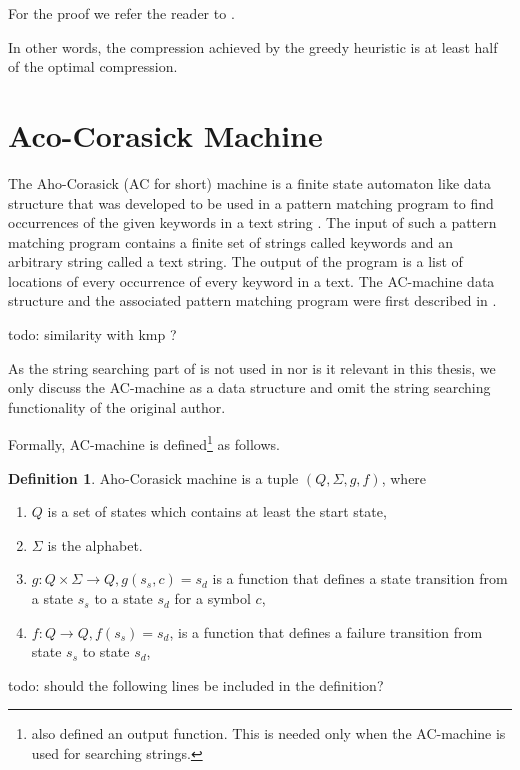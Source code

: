 \documentclass[english,twoside,censored,csm,algorithms-track-2020]{HYthesisML}
\theoremstyle{plain}
\theoremstyle{definition}
\newtheorem{definition}[theorem]{Definition}
\begin{document}
For the proof we refer the reader to \citep{Tarhio88}.

In other words, the compression achieved by the greedy heuristic is at least half of the optimal
compression. 




\section{Aco-Corasick Machine}


  
The Aho-Corasick (AC for short) machine is a finite state automaton like data structure that was
developed to be used
in a pattern matching program to find occurrences of the given keywords in a text string \citep{Aho75}.
The input of such a pattern matching program contains a finite set of strings called keywords and an
arbitrary string called a text string. The output of the program is a list of locations of every
occurrence of every keyword in a text. The AC-machine data structure and the associated pattern
matching program were first described in \citep{Aho75}.

todo: similarity with kmp ?

As the string searching part of \citep{Aho75} is not used in \citep{Ukkonen90} nor is it relevant in
this thesis, we only discuss the AC-machine as a data structure and omit the string searching
functionality of the original author.

Formally, AC-machine is defined\footnote{\citep{Aho75} also defined an output function.
This is needed only when the AC-machine is used for searching strings.} as follows.

\begin{definition}
  Aho-Corasick machine is a tuple $(Q, \Sigma, g, f)$, where
  \begin{enumerate}
    \item $Q$ is a set of states which contains at least the start state, \\
    \item $\Sigma$ is the alphabet.
    \item $g : Q \times \Sigma \rightarrow Q, g(s_s,c) = s_d$ is a function that defines a state transition from a state $s_s$ to a state $s_d$ for a symbol $c$, \\
    \item $f : Q \rightarrow Q, f(s_s) = s_d$, is a function that defines a failure transition from state $s_s$ to state $s_d$,
  \end{enumerate}
\end{definition}
todo: should the following lines be included in the definition?
\end{document}
